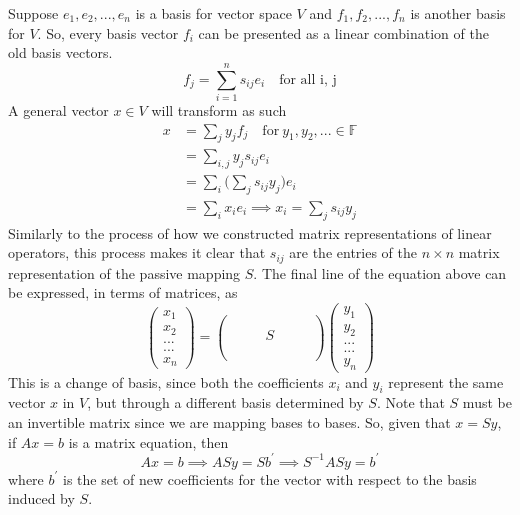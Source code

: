 \documentclass{article}
\theoremstyle{remark}
\theoremstyle{definition}
\begin{document}
Suppose ${e_1, e_2, ..., e_n}$ is a basis for vector space $V$ and ${f_1, f_2, ..., f_n}$ is another basis for $V$. So, every basis vector $f_i$ can be presented as a linear combination of the old basis vectors. 
\[f_j = \sum_{i =1}^{n} s_{i j} e_i \quad \text{for all i, j}\]
A general vector $x \in V$ will transform as such
\begin{equation} \label{eq1}
\begin{split}
x & = \sum_{j} y_j f_j \quad \text{for} \ y_{1}, y_{2}, ... \in \mathbb{F} \\
 & = \sum_{i,j} y_j s_{i j} e_i \\
 & = \sum_{i} \Big( \sum_{j} s_{i j} y_j \Big) e_i \\
 & = \sum_{i} x_i e_i \implies x_i = \sum_{j} s_{i j} y_j
\end{split}
\end{equation}
Similarly to the process of how we constructed matrix representations of linear operators, this process makes it clear that $s_{i j}$ are the entries of the $n \times n$ matrix representation of the passive mapping $S$. The final line of the equation above can be expressed, in terms of matrices, as 
\[\begin{pmatrix}x_1\\x_2\\...\\...\\x_n\end{pmatrix} = 
\begin{pmatrix} \\ \\ & & & S & & &  \\\\\\\end{pmatrix} \begin{pmatrix}
y_1\\y_2\\...\\...\\y_n\end{pmatrix} \]
This is a change of basis, since both the coefficients $x_i$ and $y_i$ represent the same vector $x$ in $V$, but through a different basis determined by $S$. Note that $S$ must be an invertible matrix since we are mapping bases to bases. So, given that $x = S y$, if $Ax = b$ is a matrix equation, then
\[A x = b \implies A S y = S b^\prime \implies S^{-1} A S y = b^\prime\]
where $b^\prime$ is the set of new coefficients for the vector with respect to the basis induced by $S$. 
\end{document}
